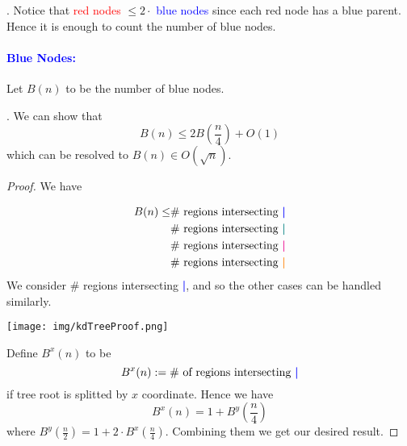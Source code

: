 \documentclass{article}
\begin{document}
\begin{discovery}[].
    Notice that \textcolor{red}{red nodes} $\leq 2 \cdot$ \textcolor{blue}{blue nodes} since each red node has a blue parent. Hence it is enough to count the number of blue nodes.  
\end{discovery}

\paragraph{\textcolor{blue}{Blue Nodes:}} Let $B(n)$ to be the number of blue nodes. 

\begin{thmm}[].
    We can show that 
    \[ B(n) \leq 2 B \left( \frac{n}{4} \right) + O(1) \]
    which can be resolved to $B(n) \in O(\sqrt{n})$. 
\end{thmm}

\begin{proof}
    We have 

    \begin{minipage}{0.5\textwidth}
        \begin{align*}
            B(n) \leq 
            & \text{\# regions intersecting } \textcolor{blue}{\textbf{|}}\\ 
            & \text{\# regions intersecting } \textcolor{teal}{\textbf{|}}\\ 
            & \text{\# regions intersecting } \textcolor{magenta}{\textbf{|}} \\ 
            & \text{\# regions intersecting } \textcolor{orange}{\textbf{|}} \\ 
        \end{align*}
        We consider \# regions intersecting \textcolor{blue}{\textbf{|}}, and so the other cases can be handled similarly. 
    \end{minipage} \begin{minipage}{0.4\textwidth}
        \begin{center}
            \texttt{[image: img/kdTreeProof.png]}
        \end{center}
    \end{minipage}

    Define $B^x(n)$ to be 
    \[ B^x(n) := \text{\# of regions intersecting } \textcolor{blue}{\textbf{|}} \]
    if tree root is splitted by $x$ coordinate. Hence we have 
    \[ B^x(n) = 1 + B^y \left( \frac{n}{4} \right) \]
    where $\displaystyle B^y \left( \frac{n}{2} \right) = 1 + 2 \cdot B^x \left( \frac{n}{4} \right)$. Combining them we get our desired result. 
\end{proof}
\end{document}
